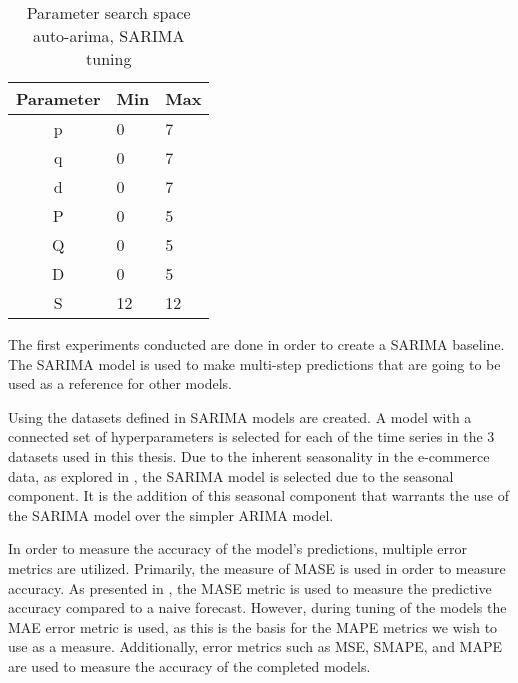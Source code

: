 \begin{table}[h]
  \centering
  \caption{Parameter search space auto-arima, SARIMA tuning}
  \label{table:method:arima-tuning}
  \begin{tabular}{|c|l|l|}\hline
    Parameter & Min & Max \\ \hline
    p         & 0   & 7   \\ \hline
    q         & 0   & 7   \\ \hline
    d         & 0   & 7   \\ \hline
    P         & 0   & 5   \\ \hline
    Q         & 0   & 5   \\ \hline
    D         & 0   & 5   \\ \hline
    S         & 12  & 12  \\ \hline
  \end{tabular}
\end{table}





\iffalse



  The first experiments conducted are done in order to create a SARIMA baseline.
  The SARIMA model is used to make multi-step predictions that are going to be used as a reference for other models.

  Using the datasets defined in  SARIMA models are created.
  A model with a connected set of hyperparameters is selected for each of the time series in the 3 datasets used in this thesis.
  Due to the inherent seasonality in the e-commerce data, as explored in ,
  the SARIMA model is selected due to the seasonal component.
  It is the addition of this seasonal component that warrants the use of the SARIMA model over the simpler ARIMA model.

  In order to measure the accuracy of the model's predictions, multiple error metrics are utilized.
  Primarily, the measure of MASE is used in order to measure accuracy.
  As presented in , the MASE metric is used to measure the predictive accuracy
  compared to a naive forecast.
  However, during tuning of the models the MAE error metric is used, as this is the basis for the MAPE metrics we wish to use as a measure.
  Additionally, error metrics such as MSE, SMAPE, and MAPE are used to measure the accuracy of the completed models.

